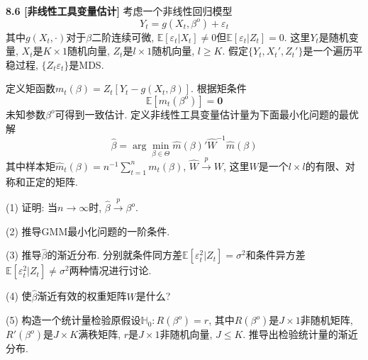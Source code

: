 \documentclass[cn,12pt,math=mtpro2,citestyle=gb7714-2015,bibstyle=gb7714-2015,twocol,mode=simple]{elegantbook}
\newcommand{\HH}{\mathbb{H}}
\newcommand{\E}{\mathbb{E}}
\newcommand{\hatm}{\hat{m}}
\begin{document}
  \textbf{8.6 [非线性工具变量估计]} 考虑一个非线性回归模型
  $$Y_t=g(X_t,\beta^o)+\varepsilon_t$$
  其中$g(X_t,\cdot)$对于$\beta$二阶连续可微, $\E[\varepsilon_t|X_t]\neq0$但$\E[\varepsilon_t|Z_t]=0$. 这里$Y_t$是随机变量, $X_t$是$K\times1$随机向量, $Z_t$是$l\times1$随机向量, $l\geq K$. 假定$\{Y_t,X_t',Z_t'\}$是一个遍历平稳过程, $\{Z_t\varepsilon_t\}$是MDS.

  定义矩函数$m_t(\beta)=Z_t[Y_t-g(X_t,\beta)]$. 根据矩条件
  $$\E[m_t(\beta^o)]=\mathbf{0}$$
  未知参数$\beta^o$可得到一致估计. 定义非线性工具变量估计量为下面最小化问题的最优解
  $$\hat{\beta}=\arg\min_{\beta\in\Theta}\hatm(\beta)'\hat{W}^{-1}\hatm(\beta)$$
  其中样本矩$\displaystyle\hat{m}_t(\beta)=n^{-1}\sum_{t=1}^{n}m_t(\beta)$, $\hat{W}\xrightarrow{p}W$, 这里$W$是一个$l\times l$的有限、对称和正定的矩阵.

  (1) 证明: 当$n\to\infty$时, $\hat{\beta}\xrightarrow{p}\beta^o$.

   (2) 推导GMM最小化问题的一阶条件.

   (3) 推导$\hat{\beta}$的渐近分布. 分别就条件同方差$\E[\varepsilon_t^2|Z_t]=\sigma^2$和条件异方差$\E[\varepsilon_t^2|Z_t]\neq\sigma^2$两种情况进行讨论.

   (4) 使$\hat{\beta}$渐近有效的权重矩阵$W$是什么?

   (5) 构造一个统计量检验原假设$\HH_0:R(\beta^o)=r$, 其中$R(\beta^o)$是$J\times1$非随机矩阵,  $R'(\beta^o)$是$J\times K$满秩矩阵, $r$是$J\times1$非随机向量, $J\leq K$. 推导出检验统计量的渐近分布.
\end{document}
